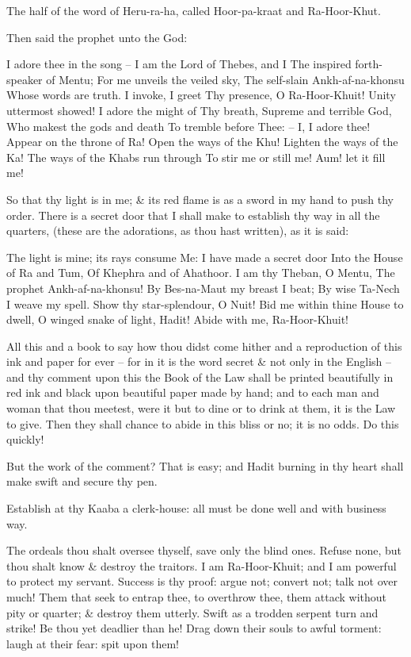 The half of the word of Heru-ra-ha, called Hoor-pa-kraat and Ra-Hoor-Khut.

Then said the prophet unto the God:

I adore thee in the song --
I am the Lord of Thebes, and I
The inspired forth-speaker of Mentu;
For me unveils the veiled sky,
The self-slain Ankh-af-na-khonsu
Whose words are truth. I invoke, I greet
Thy presence, O Ra-Hoor-Khuit!
Unity uttermost showed!
I adore the might of Thy breath,
Supreme and terrible God,
Who makest the gods and death
To tremble before Thee: --
I, I adore thee!
Appear on the throne of Ra!
Open the ways of the Khu!
Lighten the ways of the Ka!
The ways of the Khabs run through
To stir me or still me!
Aum! let it fill me!

So that thy light is in me; & its red flame is as a sword in my hand to push thy order. There is a secret door that I shall make to establish thy way in all the quarters, (these are the adorations, as thou hast written), as it is said:\par
The light is mine; its rays consume
Me: I have made a secret door
Into the House of Ra and Tum,
Of Khephra and of Ahathoor.
I am thy Theban, O Mentu,
The prophet Ankh-af-na-khonsu!
By Bes-na-Maut my breast I beat;
By wise Ta-Nech I weave my spell.
Show thy star-splendour, O Nuit!
Bid me within thine House to dwell,
O winged snake of light, Hadit!
Abide with me, Ra-Hoor-Khuit!

All this and a book to say how thou didst come hither and a reproduction of this ink and paper for ever -- for in it is the word secret & not only in the English -- and thy comment upon this the Book of the Law shall be printed beautifully in red ink and black upon beautiful paper made by hand; and to each man and woman that thou meetest, were it but to dine or to drink at them, it is the Law to give. Then they shall chance to abide in this bliss or no; it is no odds. Do this quickly!

But the work of the comment? That is easy; and Hadit burning in thy heart shall make swift and secure thy pen.

Establish at thy Kaaba a clerk-house: all must be done well and with business way.

The ordeals thou shalt oversee thyself, save only the blind ones. Refuse none, but thou shalt know & destroy the traitors. I am Ra-Hoor-Khuit; and I am powerful to protect my servant. Success is thy proof: argue not; convert not; talk not over much! Them that seek to entrap thee, to overthrow thee, them attack without pity or quarter; & destroy them utterly. Swift as a trodden serpent turn and strike! Be thou yet deadlier than he! Drag down their souls to awful torment: laugh at their fear: spit upon them!

